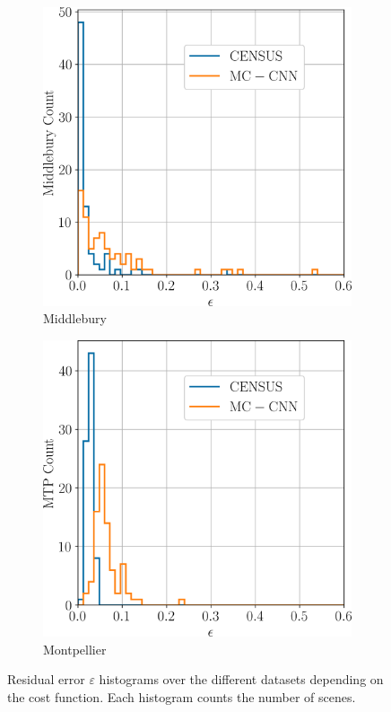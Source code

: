 \begin{figure}
    \centering
    \begin{subfigure}[t]{0.5\linewidth}
        \centering
        \includegraphics[width=\linewidth]{Images/Chap_5/histogram_eps_middlebury.png}
        \caption{Middlebury}
        \label{fig:eps_middlebury}
    \end{subfigure}\hfill
    \begin{subfigure}[t]{0.5\linewidth}
        \centering
        \includegraphics[width=\linewidth]{Images/Chap_5/histogram_eps_mtp.png}
        \caption{Montpellier}
        \label{fig:eps_mtp}
    \end{subfigure}
    \caption{Residual error $\varepsilon$ histograms over the different datasets depending on the cost function. Each histogram counts the number of scenes.}
    \label{fig:eps_hist}
\end{figure}

